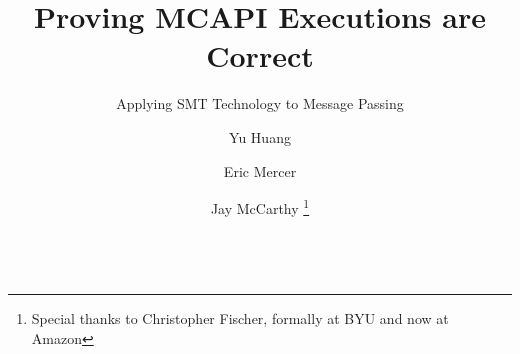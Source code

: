 \documentclass[preprint]{acm_proc_article-sp}
\begin{document}
%
%
\title{Proving MCAPI Executions are Correct}
\subtitle{Applying SMT Technology to Message Passing}

\author{
Yu Huang\and  Eric Mercer\and Jay McCarthy \thanks{Special thanks to Christopher Fischer, formally at BYU and now at Amazon}\\
 \\
    }

\maketitle



%
%
\begin{abstract}


\end{abstract}
%





%





\end{document}

